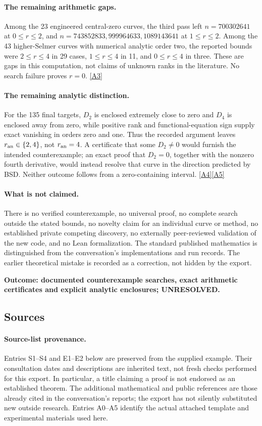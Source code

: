 \documentclass[11pt]{article}
\newcommand{\srcref}[1]{\hyperlink{source:#1}{[#1]}}
\begin{document}
\paragraph{The remaining arithmetic gaps.}
Among the 23 engineered central-zero curves, the third pass left
$n=700302641$ at $0\le r\le2$, and
$n=743852833,999964633,1089143641$ at $1\le r\le2$.
Among the 43 higher-Selmer curves with numerical analytic order two, the
reported bounds were $2\le r\le4$ in 29 cases, $1\le r\le4$ in 11,
and $0\le r\le4$ in three. These are gaps in this computation, not claims of
unknown ranks in the literature. No search failure proves $r=0$.
\srcref{A3}

\paragraph{The remaining analytic distinction.}
For the 135 final targets, $D_2$ is enclosed extremely close to zero and $D_4$
is enclosed away from zero, while positive rank and functional-equation sign
supply exact vanishing in orders zero and one. Thus the recorded argument
leaves $r_{\rm an}\in\{2,4\}$, not $r_{\rm an}=4$.
A certificate that some $D_2\ne0$ would furnish the intended counterexample;
an exact proof that $D_2=0$, together with the nonzero fourth derivative,
would instead resolve that curve in the direction predicted by BSD.
Neither outcome follows from a zero-containing interval.
\srcref{A4}\srcref{A5}

\paragraph{What is not claimed.}
There is no verified counterexample, no universal proof, no complete search
outside the stated bounds, no novelty claim for an individual curve or method,
no established private competing discovery, no externally peer-reviewed
validation of the new code, and no Lean formalization. The standard published
mathematics is distinguished from the conversation's implementations and run
records. The earlier theoretical mistake is recorded as a correction, not
hidden by the export.

\textbf{Outcome: documented counterexample searches, exact arithmetic
certificates and explicit analytic enclosures; UNRESOLVED.}
\subsection{Sources}
\paragraph{Source-list provenance.}
Entries S1--S4 and E1--E2 below are preserved from the supplied example.
Their consultation dates and descriptions are inherited text, not fresh checks
performed for this export. In particular, a title claiming a proof is not
endorsed as an established theorem. The additional mathematical and public
references are those already cited in the conversation's reports; the export
has not silently substituted new outside research. Entries A0--A5 identify the
actual attached template and experimental materials used here.
\end{document}
